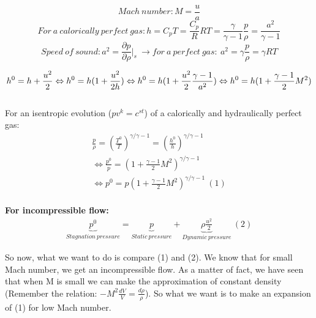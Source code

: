 \begin{equation}
Mach\ number: M=\frac{u}{a}
\end{equation}
\begin{equation}
For\ a\ calorically\ perfect\ gas: h=C_pT=\frac{C_p}{R}RT=\frac{\gamma}{\gamma-1}\frac{p}{\rho}=\frac{a^2}{\gamma -1} 
\end{equation}
\begin{equation}
Speed\ of\ sound: a^2=\frac{\partial p}{\partial \rho}|_s \ \rightarrow for\ a\ perfect\ gas:\ a^2=\gamma \frac{p}{\rho}=\gamma RT
\end{equation}

\begin{equation}
 h^0=h+\frac{u^2}{2} \Leftrightarrow h^0=h(1+\frac{u^2}{2h}) \Leftrightarrow h^0=h(1+\frac{u^2}{2} \frac{\gamma -1}{a^2}) \\
 \Leftrightarrow h^0=h(1+ \frac{\gamma -1}{2} M^2) 
\end{equation}
\\

For an isentropic evolution ($pv^k=c^{st}$) of a calorically and hydraulically perfect gas:
\begin{equation}
\begin{aligned}
\frac{p}{\rho}=(\frac{T^0}{T})^{\gamma/\gamma-1}=(\frac{h^0}{h})^{\gamma/\gamma-1} \\
\Leftrightarrow \frac{p^0}{p}=(1+\frac{\gamma-1}{2}M^2)^{\gamma/\gamma-1} \\
\Leftrightarrow p^0=p(1+\frac{\gamma-1}{2}M^2)^{\gamma/\gamma-1}\ (1)
\end{aligned}
\end{equation}
\\

\textbf{For incompressible flow:}
\begin{equation}
\begin{aligned}
\underbrace{p^0}_{Stagnation\ pressure}=\underbrace{p}_{Static\ pressure}+\underbrace{\rho\frac{u^2}{2}}_{Dynamic\ pressure} \ (2)
\end{aligned}
\end{equation}

So now, what we want to do is compare (1) and (2). We know that for small Mach number, we get an incompressible flow. As a matter of fact, we have seen that when M is small we can make the approximation of constant density (Remember the relation: $-M^2\frac{dV}{V}=\frac{d\rho}{\rho}$). So what we want is to make an expansion of (1) for low Mach number.

